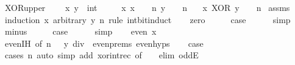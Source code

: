 \begin{isabellebody}
%
\isadelimproof
\isanewline
%
\endisadelimproof
\isanewline
{}\isamarkupfalse%
\ XOR{\isacharunderscore}{\kern0pt}upper{\isacharcolon}{\kern0pt}\ \isanewline
\ \ \ x\ y\ {\isacharcolon}{\kern0pt}{\isacharcolon}{\kern0pt}\ int\isanewline
\ \ \ {\isacartoucheopen}{}\ {\isasymle}\ x{\isacartoucheclose}\ {\isacartoucheopen}x\ {\isacharless}{\kern0pt}\ {}\ {\isacharcircum}{\kern0pt}\ n{\isacartoucheclose}\ {\isacartoucheopen}y\ {\isacharless}{\kern0pt}\ {}\ {\isacharcircum}{\kern0pt}\ n{\isacartoucheclose}\isanewline
\ \ \ {\isacartoucheopen}x\ XOR\ y\ {\isacharless}{\kern0pt}\ {}\ {\isacharcircum}{\kern0pt}\ n{\isacartoucheclose}\isanewline
%
\isadelimproof
%
\endisadelimproof
%
\isatagproof
{}\isamarkupfalse%
\ assms\ \isamarkupfalse%
\ {\isacharparenleft}{\kern0pt}induction\ x\ arbitrary{\isacharcolon}{\kern0pt}\ y\ n\ rule{\isacharcolon}{\kern0pt}\ int{\isacharunderscore}{\kern0pt}bit{\isacharunderscore}{\kern0pt}induct{\isacharparenright}{\kern0pt}\isanewline
\ \ \isamarkupfalse%
\ zero\isanewline
\ \ \isamarkupfalse%
\ \isamarkupfalse%
\ {\isacharquery}{\kern0pt}case\isanewline
\ \ \ \ \isamarkupfalse%
\ simp\isanewline
{}\isamarkupfalse%
\isanewline
\ \ \isamarkupfalse%
\ minus\isanewline
\ \ \isamarkupfalse%
\ \isamarkupfalse%
\ {\isacharquery}{\kern0pt}case\isanewline
\ \ \ \ \isamarkupfalse%
\ simp\isanewline
{}\isamarkupfalse%
\isanewline
\ \ \isamarkupfalse%
\ {\isacharparenleft}{\kern0pt}even\ x{\isacharparenright}{\kern0pt}\isanewline
\ \ \isamarkupfalse%
\ even{\isachardot}{\kern0pt}IH\ {\isacharbrackleft}{\kern0pt}of\ {\isacartoucheopen}n\ {\isacharminus}{\kern0pt}\ {}{\isacartoucheclose}\ {\isacartoucheopen}y\ div\ {}{\isacartoucheclose}{\isacharbrackright}{\kern0pt}\ even{\isachardot}{\kern0pt}prems\ even{\isachardot}{\kern0pt}hyps\isanewline
\ \ \isamarkupfalse%
\ {\isacharquery}{\kern0pt}case\ \isanewline
\ \ \ \ \isamarkupfalse%
\ {\isacharparenleft}{\kern0pt}cases\ n{\isacharparenright}{\kern0pt}\ {\isacharparenleft}{\kern0pt}auto\ simp\ add{\isacharcolon}{\kern0pt}\ xor{\isacharunderscore}{\kern0pt}int{\isacharunderscore}{\kern0pt}rec\ {\isacharbrackleft}{\kern0pt}of\ {\isacartoucheopen}{\isacharunderscore}{\kern0pt}\ {\isacharasterisk}{\kern0pt}\ {}{\isacartoucheclose}{\isacharbrackright}{\kern0pt}\ elim{\isacharcolon}{\kern0pt}\ oddE{\isacharparenright}{\kern0pt}\isanewline

\end{isabellebody}
